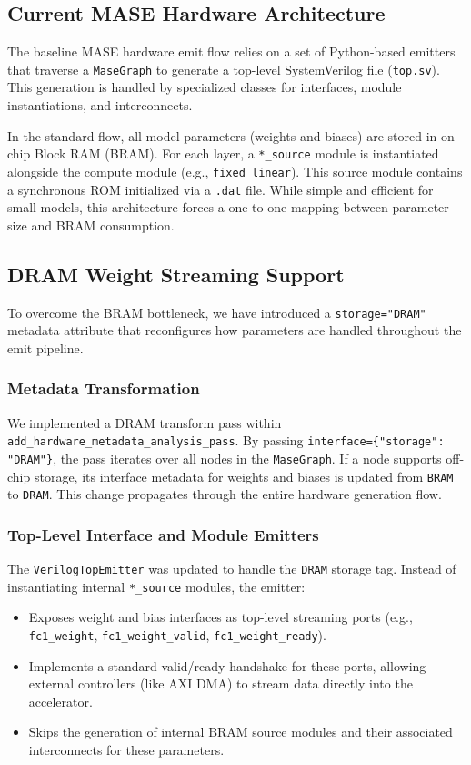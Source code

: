 \documentclass[11pt,a4paper]{article}
\begin{document}
\subsection{Current MASE Hardware Architecture}

The baseline MASE hardware emit flow relies on a set of Python-based emitters
that traverse a \texttt{MaseGraph} to generate a top-level SystemVerilog file
(\texttt{top.sv}). This generation is handled by specialized classes for
interfaces, module instantiations, and interconnects.

In the standard flow, all model parameters (weights and biases) are stored in
on-chip Block RAM (BRAM). For each layer, a \texttt{*\_source} module is
instantiated alongside the compute module (e.g., \texttt{fixed\_linear}). This
source module contains a synchronous ROM initialized via a \texttt{.dat} file.
While simple and efficient for small models, this architecture forces a
one-to-one mapping between parameter size and BRAM consumption.

\subsection{DRAM Weight Streaming Support}

To overcome the BRAM bottleneck, we have introduced a \texttt{storage="DRAM"}
metadata attribute that reconfigures how parameters are handled throughout the
emit pipeline.

\subsubsection{Metadata Transformation}
We implemented a DRAM transform pass within \texttt{add\_hardware\_metadata\_analysis\_pass}.
By passing \texttt{interface=\{"storage": "DRAM"\}}, the pass iterates over all
nodes in the \texttt{MaseGraph}. If a node supports off-chip storage, its
interface metadata for weights and biases is updated from \texttt{BRAM} to
\texttt{DRAM}. This change propagates through the entire hardware generation
flow.

\subsubsection{Top-Level Interface and Module Emitters}
The \texttt{VerilogTopEmitter} was updated to handle the \texttt{DRAM} storage
tag. Instead of instantiating internal \texttt{*\_source} modules, the emitter:
\begin{itemize}
    \item Exposes weight and bias interfaces as top-level streaming ports
    (e.g., \texttt{fc1\_weight}, \texttt{fc1\_weight\_valid}, \texttt{fc1\_weight\_ready}).
    \item Implements a standard valid/ready handshake for these ports, allowing
    external controllers (like AXI DMA) to stream data directly into the
    accelerator.
    \item Skips the generation of internal BRAM source modules and their
    associated interconnects for these parameters.
\end{itemize}
\end{document}
